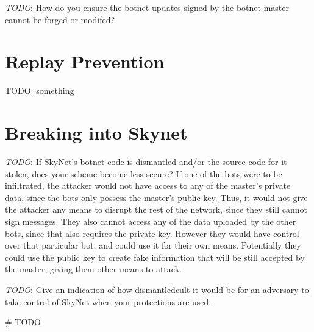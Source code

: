 \documentclass[9pt,a4paper]{article}
\begin{document}
\emph{TODO}: How do you ensure the botnet updates signed by the botnet master cannot be forged or modifed?

\section{Replay Prevention}
TODO: something

\section{Breaking into Skynet}
\emph{TODO}: If SkyNet's botnet code is dismantled and/or the source code for it stolen, does your scheme become less secure?
If one of the bots were to be infiltrated, the attacker would not have access to any of the master's private data, since the bots only possess the master's public key. Thus, it would not give the attacker any means to disrupt the rest of the network, since they still cannot sign messages. They also cannot access any of the data uploaded by the other bots, since that also requires the private key. However they would have control over that particular bot, and could use it for their own means. Potentially they could use the public key to create fake information that will be still accepted by the master, giving them other means to attack. 

\emph{TODO}: Give an indication of how dismantledcult it would be for an adversary to take control of SkyNet when your protections are used.

\begin{center}
\vspace{-2ex}
\begin{python}
# TODO
\end{python}
\end{center}
\end{document}
